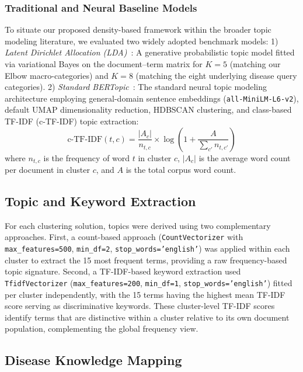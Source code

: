 \documentclass[a4paper,fleqn]{cas-dc}
\begin{document}
\subsubsection{Traditional and Neural Baseline Models}

To situate our proposed density-based framework within the broader topic modeling literature, we evaluated two widely adopted benchmark models:
1) \textit{Latent Dirichlet Allocation (LDA)}~\cite{ref35}: A generative probabilistic topic model fitted via variational Bayes on the document--term matrix for $K=5$ (matching our Elbow macro-categories) and $K=8$ (matching the eight underlying disease query categories).
2) \textit{Standard BERTopic}~\cite{ref17}: The standard neural topic modeling architecture employing general-domain sentence embeddings (\texttt{all-MiniLM-L6-v2}), default UMAP dimensionality reduction, HDBSCAN clustering, and class-based TF-IDF (c-TF-IDF) topic extraction:
\begin{equation}
\text{c-TF-IDF}(t, c) = \frac{|A_c|}{n_{t,c}} \times \log \left( 1 + \frac{A}{\sum_{c'} n_{t,c'}} \right)
\end{equation}
where $n_{t,c}$ is the frequency of word $t$ in cluster $c$, $|A_c|$ is the average word count per document in cluster $c$, and $A$ is the total corpus word count.

\subsection{Topic and Keyword Extraction}

For each clustering solution, topics were derived using two complementary approaches. First, a count-based approach (\texttt{CountVectorizer} with \texttt{max\_features=500}, \texttt{min\_df=2}, \texttt{stop\_words='english'}) was applied within each cluster to extract the 15 most frequent terms, providing a raw frequency-based topic signature. Second, a TF-IDF-based keyword extraction used \texttt{TfidfVectorizer} (\texttt{max\_features=200}, \texttt{min\_df=1}, \texttt{stop\_words='english'}) fitted per cluster independently, with the 15 terms having the highest mean TF-IDF score serving as discriminative keywords. These cluster-level TF-IDF scores identify terms that are distinctive within a cluster relative to its own document population, complementing the global frequency view.

\subsection{Disease Knowledge Mapping}
\end{document}
